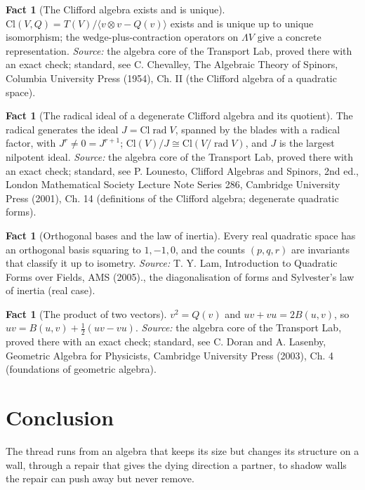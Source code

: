 \documentclass[11pt]{article}
\theoremstyle{definition}
\newtheorem{fact}[theorem]{Fact}
\theoremstyle{plain}
\providecommand{\Cl}{}\renewcommand{\Cl}{\mathrm{Cl}}
\begin{document}
\begin{fact}[The Clifford algebra exists and is unique]\label{c:std-algebra.existence-uniqueness}
$\Cl(V, Q) = T(V)/\langle v \otimes v - Q(v) \rangle$ exists and is unique up to unique isomorphism; the wedge-plus-contraction operators on $\Lambda V$ give a concrete representation.
\emph{Source:} the algebra core of the Transport Lab, proved there with an exact check; standard, see C. Chevalley, The Algebraic Theory of Spinors, Columbia University Press (1954), Ch. II (the Clifford algebra of a quadratic space).
\end{fact}

\begin{fact}[The radical ideal of a degenerate Clifford algebra and its quotient]\label{c:std-algebra.radical-ideal-and-quotient}
The radical generates the ideal $J = \Cl\operatorname{rad}V$, spanned by the blades with a radical factor, with $J^{r} \ne 0 = J^{r+1}$; $\Cl(V)/J \cong \Cl(V/\operatorname{rad}V)$, and $J$ is the largest nilpotent ideal.
\emph{Source:} the algebra core of the Transport Lab, proved there with an exact check; standard, see P. Lounesto, Clifford Algebras and Spinors, 2nd ed., London Mathematical Society Lecture Note Series 286, Cambridge University Press (2001), Ch. 14 (definitions of the Clifford algebra; degenerate quadratic forms).
\end{fact}

\begin{fact}[Orthogonal bases and the law of inertia]\label{c:std-algebra.sylvester-inertia}
Every real quadratic space has an orthogonal basis squaring to $1, -1, 0$, and the counts $(p, q, r)$ are invariants that classify it up to isometry.
\emph{Source:} T. Y. Lam, Introduction to Quadratic Forms over Fields, AMS (2005)., the diagonalisation of forms and Sylvester's law of inertia (real case).
\end{fact}

\begin{fact}[The product of two vectors]\label{c:std-algebra.vector-squares}
$v^{2} = Q(v)$ and $uv + vu = 2B(u, v)$, so $uv = B(u, v) + \tfrac12(uv - vu)$.
\emph{Source:} the algebra core of the Transport Lab, proved there with an exact check; standard, see C. Doran and A. Lasenby, Geometric Algebra for Physicists, Cambridge University Press (2003), Ch. 4 (foundations of geometric algebra).
\end{fact}

\section*{Conclusion}
The thread runs from an algebra that keeps its size but changes its structure on a wall, through a repair that gives the dying direction a partner, to shadow walls the repair can push away but never remove.
\end{document}
